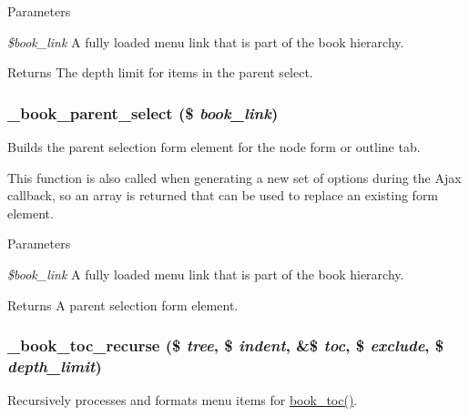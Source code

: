 \begin{DoxyParams}{Parameters}
\item[{\em \$book\_\-link}]A fully loaded menu link that is part of the book hierarchy.\end{DoxyParams}
\begin{DoxyReturn}{Returns}
The depth limit for items in the parent select. 
\end{DoxyReturn}
\hypertarget{book_8module_a36eb1775bf729cb6af08d2feb4e87116}{
\subsubsection[{\_\-book\_\-parent\_\-select}]{\setlength{\rightskip}{0pt plus 5cm}\_\-book\_\-parent\_\-select (\$ {\em book\_\-link})}}
\label{book_8module_a36eb1775bf729cb6af08d2feb4e87116}
Builds the parent selection form element for the node form or outline tab.

This function is also called when generating a new set of options during the Ajax callback, so an array is returned that can be used to replace an existing form element.


\begin{DoxyParams}{Parameters}
\item[{\em \$book\_\-link}]A fully loaded menu link that is part of the book hierarchy.\end{DoxyParams}
\begin{DoxyReturn}{Returns}
A parent selection form element. 
\end{DoxyReturn}
\hypertarget{book_8module_a3212bd000878f6a7cafb2a6561d2e80b}{
\subsubsection[{\_\-book\_\-toc\_\-recurse}]{\setlength{\rightskip}{0pt plus 5cm}\_\-book\_\-toc\_\-recurse (\$ {\em tree}, \/  \$ {\em indent}, \/  \&\$ {\em toc}, \/  \$ {\em exclude}, \/  \$ {\em depth\_\-limit})}}
\label{book_8module_a3212bd000878f6a7cafb2a6561d2e80b}
Recursively processes and formats menu items for \hyperlink{book_8module_a36327566aaf222eb728c9aa69b554e69}{book\_\-toc()}.

